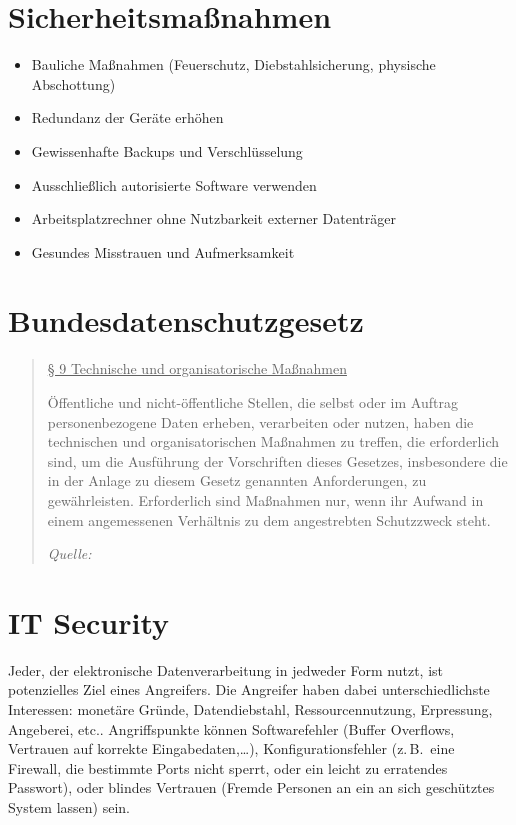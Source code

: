 \section{Sicherheitsmaßnahmen}
\begin{itemize}
  \item Bauliche Maßnahmen (Feuerschutz, Diebstahlsicherung, physische Abschottung)
  \item Redundanz der Geräte erhöhen
  \item Gewissenhafte Backups und Verschlüsselung
  \item Ausschließlich autorisierte Software verwenden
  \item Arbeitsplatzrechner ohne Nutzbarkeit externer Datenträger
  \item Gesundes Misstrauen und Aufmerksamkeit
\end{itemize}

\section{Bundesdatenschutzgesetz}

\begin{quotation}
  \uline{§ 9 Technische und organisatorische Maßnahmen}

  Öffentliche und nicht-öffentliche Stellen, die selbst oder im Auftrag personenbezogene Daten erheben, verarbeiten oder nutzen, haben die technischen und organisatorischen Maßnahmen zu treffen, die erforderlich sind, um die Ausführung der Vorschriften dieses Gesetzes, insbesondere die in der Anlage zu diesem Gesetz genannten Anforderungen, zu gewährleisten.
  Erforderlich sind Maßnahmen nur, wenn ihr Aufwand in einem angemessenen Verhältnis zu dem angestrebten Schutzzweck steht.

  \begin{flushright}
    \emph{Quelle: \cite{BDSG9}}
  \end{flushright}
\end{quotation}



\section{IT Security}
Jeder, der elektronische Datenverarbeitung in jedweder Form nutzt, ist potenzielles Ziel eines Angreifers.
Die Angreifer haben dabei unterschiedlichste Interessen: monetäre Gründe, Datendiebstahl, Ressourcennutzung, Erpressung, Angeberei, etc..
Angriffspunkte können Softwarefehler (Buffer Overflows, Vertrauen auf korrekte Eingabedaten,\ldots), Konfigurationsfehler (z.\,B.~eine Firewall, die bestimmte Ports nicht sperrt, oder ein leicht zu erratendes Passwort), oder blindes Vertrauen (Fremde Personen an ein an sich geschütztes System lassen) sein.

